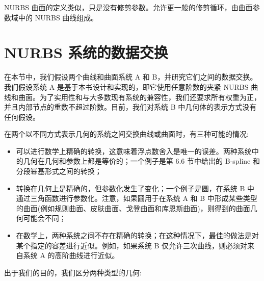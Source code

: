 \documentclass[../main.tex]{subfiles}
\begin{document}
NURBS 曲面的定义类似，只是没有修剪参数。允许更一般的修剪循环，由曲面参数域中的 NURBS 曲线组成。



\section{NURBS 系统的数据交换}

在本节中，我们假设两个曲线和曲面系统 A 和 B，并研究它们之间的数据交换。我们假设系统 A 是基于本书设计和实现的，即它使用任意阶数的夹紧 NURBS 曲线和曲面。为了实用性和与大多数现有系统的兼容性，我们还要求所有权重为正，并且内部节点的重数不超过阶数。目前，我们对系统 B 中几何体的表示方式没有任何假设。

在两个以不同方式表示几何的系统之间交换曲线或曲面时，有三种可能的情况:

\begin{itemize}
\item 可以进行数学上精确的转换，这意味着浮点数舍入是唯一的误差。两种系统中的几何在几何和参数上都是等价的；一个例子是第 6.6 节中给出的 B-spline 和分段幂基形式之间的转换；
\end{itemize}

\begin{itemize}
\item 转换在几何上是精确的，但参数化发生了变化；一个例子是圆，在系统 B 中通过三角函数进行参数化。注意，如果圆用于在系统 A 和 B 中形成某些类型的曲面(例如规则曲面、皮肤曲面、戈登曲面和库恩斯曲面)，则得到的曲面几何可能会不同；
\end{itemize}

\begin{itemize}
\item 在数学上，两种系统之间不存在精确的转换；在这种情况下，最佳的做法是对某个指定的容差进行近似。例如，如果系统 B 仅允许三次曲线，则必须对来自系统 A 的高阶曲线进行近似。
\end{itemize}

出于我们的目的，我们区分两种类型的几何:
\end{document}
